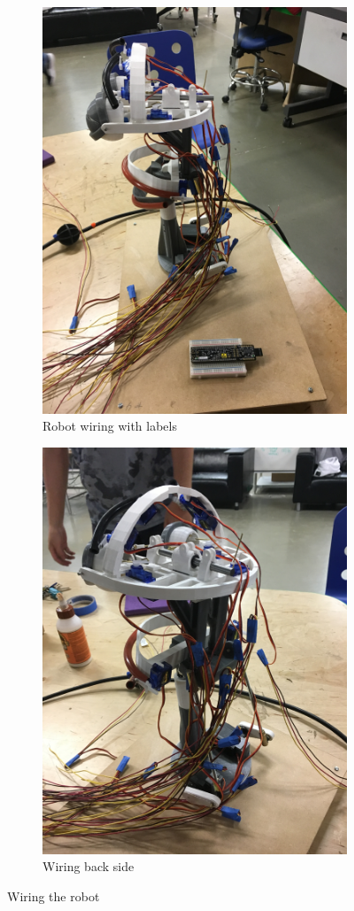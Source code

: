 \documentclass[index=totoc,hyperref,openany]{labbook} %
\begin{document}
\begin{figure}[H] %
\begin{subfigure}{.5\textwidth}
  \centering
  \includegraphics[width=.65\linewidth, angle=-90]{robot_wiring_complete}
  \caption{Robot wiring with labels}
  \label{fig:robot_wiring_complete}
\end{subfigure}%
\begin{subfigure}{.5\textwidth}
  \centering
  \includegraphics[width=.65\linewidth, angle=-90]{wiring_backside}
  \caption{Wiring back side}
  \label{fig:wiring_backside}
\end{subfigure}
\caption{Wiring the robot}
\label{fig:servo_motors}
\end{figure}
\end{document}

